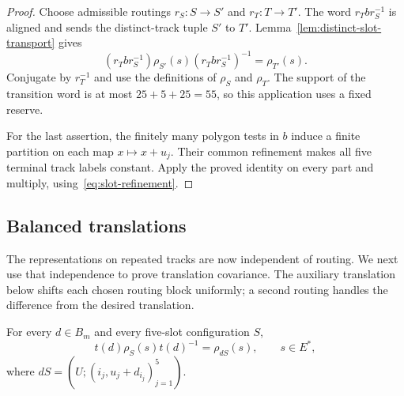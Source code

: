 \begin{proof}
Choose admissible routings $r_S:S\to S'$ and $r_T:T\to T'$.  The word
$r_Tbr_S^{-1}$ is aligned and sends the distinct-track tuple $S'$ to
$T'$.  Lemma~\ref{lem:distinct-slot-transport} gives
\[
 (r_Tbr_S^{-1})\rho_{S'}(s)(r_Tbr_S^{-1})^{-1}=\rho_{T'}(s).
\]
Conjugate by $r_T^{-1}$ and use the definitions of $\rho_S$ and $\rho_T$.
The support of the transition word is at most $25+5+25=55$, so this
application uses a fixed reserve.

For the last assertion, the finitely many polygon tests in $b$ induce
a finite partition on each map $x\mapsto x+u_j$.  Their common refinement
makes all five terminal track labels constant.  Apply the proved
identity on every part and multiply, using~\eqref{eq:slot-refinement}.
\end{proof}

\subsection{Balanced translations}

The representations on repeated tracks are now independent of routing.
We next use that independence to prove translation covariance.  The
auxiliary translation below shifts each chosen routing block uniformly;
a second routing handles the difference from the desired translation.

\begin{lemma}\label{lem:translation-slot-transport}
For every $d\in B_m$ and every five-slot configuration $S$,
\begin{equation}
 t(d)\rho_S(s)t(d)^{-1}=\rho_{dS}(s),
 \qquad s\in E^\ast,
 \label{eq:translation-slot-transport}
\end{equation}
where $dS=(U;(i_j,u_j+d_{i_j})_{j=1}^5)$.
\end{lemma}

